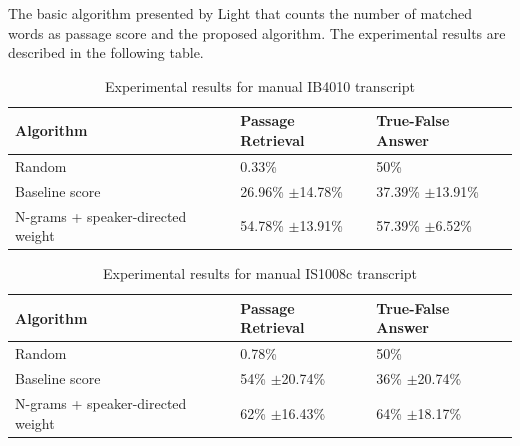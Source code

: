 \documentclass[10pt,a4paper]{article}
\numberwithin{algorithm}{section}  %
\begin{document}
 The basic algorithm presented by Light \cite{light2002aec} that counts the number of matched words as passage score and the proposed algorithm. The experimental results are described in the following table.

\begin{table}[ht!]
\caption{Experimental results for manual IB4010 transcript} %
\centering %
\begin{tabular}{|l| l | l| } %
\hline\hline %
Algorithm & Passage Retrieval & True-False Answer \\ [0.5ex] %
\hline %
    \hline Random  & 0.33\% & 50\% \\
    \hline Baseline score  & 26.96\% \ensuremath{\pm}14.78\% & 37.39\% \ensuremath{\pm}13.91\% \\
    \hline N-grams + speaker-directed weight & 54.78\% \ensuremath{\pm}13.91\% & 57.39\% \ensuremath{\pm}6.52\% \\ [1ex] %
	
\hline %
\end{tabular}
\label{tab: Experimental results for manual IB4010 transcript} %
\end{table}

\begin{table}[ht!]
\caption{Experimental results for manual IS1008c transcript} %
\centering %
\begin{tabular}{|l| l | l| } %
\hline\hline %
Algorithm & Passage Retrieval & True-False Answer  \\ [0.5ex] %
\hline %
    \hline Random  & 0.78\% & 50\%\\
    \hline Baseline score  & 54\% \ensuremath{\pm}20.74\% &36\% \ensuremath{\pm}20.74\% \\
    \hline N-grams + speaker-directed weight & 62\% \ensuremath{\pm}16.43\%& 64\% \ensuremath{\pm}18.17\% \\ [1ex] %
\hline %
\end{tabular}
\label{tab: Experimental results for manual IS1008c transcript} %
\end{table}
\end{document}

